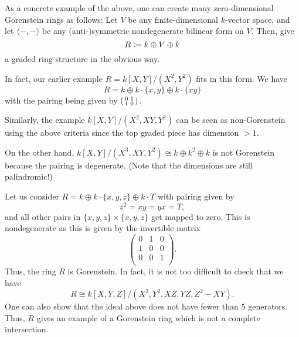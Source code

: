 \documentclass[12pt]{article}
\begin{document}
\begin{ex}
	As a concrete example of the above, one can create many zero-dimensional Gorenstein rings as follows: Let $V$ be any finite-dimensional $k$-vector space, and let $\langle -, - \rangle$ be any (anti-)symmetric nondegenerate bilinear form on $V$. Then, give
	\begin{equation*} 
		R \vcentcolon= k \oplus V \oplus k
	\end{equation*}
	a graded ring structure in the obvious way. %

	\hrulefill
	
	In fact, our earlier example $R = k[X, Y]/(X^{2}, Y^{2})$ fits in this form. We have
	\begin{equation*} 
		R = k \oplus k \cdot \{x, y\} \oplus k \cdot \{xy\}
	\end{equation*}
	with the pairing being given by $\left(\begin{smallmatrix} 0 & 1 \\ 1 & 0 \end{smallmatrix}\right)$. 

	Similarly, the example $k[X, Y]/(X^{2}, XY, Y^{2})$ can be seen as non-Gorenstein using the above criteria since the top graded piece has dimension $> 1$.

	On the other hand, $k[X, Y]/(X^{3}, XY, Y^{2}) \cong k \oplus k^{2} \oplus k$ is not Gorenstein because the pairing is degenerate. (Note that the dimensions are still palindromic!)
	
	\hrulefill
	
	Let us consider $R = k \oplus k \cdot \{x, y, z\} \oplus k \cdot T$ with pairing given by
	\begin{equation*} 
		z^{2} = xy = yx = T,
	\end{equation*}
	and all other pairs in $\{x, y, z\} \times \{x, y, z\}$ get mapped to zero. This is nondegenerate as this is given by the invertible matrix
	\begin{equation*} 
		\begin{pmatrix}
			0 & 1 & 0 \\
			1 & 0 & 0 \\
			0 & 0 & 1 \\
		\end{pmatrix}.
	\end{equation*}
	Thus, the ring $R$ is Gorenstein. In fact, it is not too difficult to check that we have
	\begin{equation*} 
		R \cong k[X, Y, Z]/(X^{2}, Y^{2}, XZ, YZ, Z^{2} - XY).
	\end{equation*}
	One can also show that the ideal above does not have fewer than $5$ generators. Thus, $R$ gives an example of a Gorenstein ring which is not a complete intersection.
\end{ex}
\end{document}
